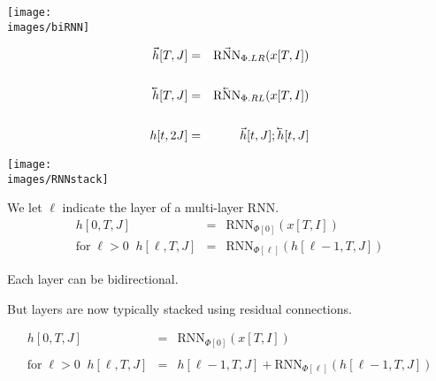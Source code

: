 {\centerline{\texttt{[image: \\images/biRNN]}}

\begin{eqnarray*}
\vec{h}[T,J] & = & \vec{\mathrm{RNN}}_{\Phi.LR}(x[T,I]) \\
\\
\cev{h}[T,J] & = & \cev{\mathrm{RNN}}_{\Phi.RL}(x[T,I]) \\
\\
h[t,2J] & = & \vec{h}[t,J];\cev{h}[t,J]
\end{eqnarray*}


\centerline{\texttt{[image: \\images/RNNstack]}}

We let $\ell$ indicate the layer of a multi-layer RNN.
\begin{eqnarray*}
h[0,T,J] & = & \mathrm{RNN}_{\Phi[0]}(x[T,I]) \\
\mbox{for} \;\ell > 0\;\;h[\ell,T,J] & = & \mathrm{RNN}_{\Phi[\ell]}(h[\ell-1,T,J])
\end{eqnarray*}

\vfill
Each layer can be bidirectional.


But layers are now typically stacked using residual connections.

\vfill
\begin{eqnarray*}
h[0,T,J] & = & \mathrm{RNN}_{\Phi[0]}(x[T,I]) \\
\\
\mbox{for} \;\ell > 0\;\;h[\ell,T,J] & = & h[\ell-1,T,J] + \mathrm{RNN}_{\Phi[\ell]}(h[\ell-1,T,J])
\end{eqnarray*}

}

